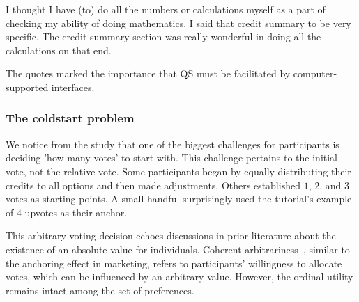 
\begin{displayquote}
I thought I have \bracketellipsis (to) do all the numbers or calculations myself as a part of checking my ability of doing mathematics. \bracketellipsis I said that credit summary to be very specific. The credit summary section was really wonderful in doing all the calculations on that end. \hfill{}
\end{displayquote}

The quotes marked the importance that QS must be facilitated by computer-supported interfaces.


\subsubsection{The coldstart problem}
We notice from the study that one of the biggest challenges for participants is deciding 'how many votes' to start with. This challenge pertains to the initial vote, not the relative vote. Some participants began by equally distributing their credits to all options and then made adjustments. Others established $1$, $2$, and $3$ votes as starting points. A small handful surprisingly used the tutorial's example of 4 upvotes as their anchor.

This arbitrary voting decision echoes discussions in prior literature about the existence of an absolute value for individuals. Coherent arbitrariness~\cite{arielyCoherentArbitrarinessStable2003}, similar to the anchoring effect in marketing, refers to participants' willingness to allocate votes, which can be influenced by an arbitrary value. However, the ordinal utility remains intact among the set of preferences.

